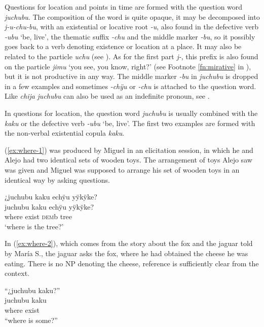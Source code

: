 Questions for location and points in time are formed with the question word \textit{juchubu}. The composition of the word is quite opaque, it may be decomposed into \textit{j-u-chu-bu}, with an existential or locative root \textit{-u}, also found in the defective verb \textit{-ubu} ‘be, live’, the thematic suffix \textit{-chu} and the middle marker \textit{-bu}, so it possibly goes back to a verb denoting existence or location at a place. It may also be related to the  particle \textit{uchu} (see ).  As for the first part \textit{j-}, this prefix is also found on the  particle \textit{jimu} ‘you see, you know, right?’ (see Footnote \ref{fn:mirative} in ), but it is not productive in any way. The middle marker \textit{-bu} in \textit{juchubu} is dropped in a few examples and sometimes \textit{-chÿu} or \textit{-chu} is attached to the question word. Like \textit{chija} \textit{juchubu} can also be used as an indefinite pronoun, see .

In questions for location, the question word \textit{juchubu} is usually combined with the  \textit{kaku} or the defective verb \textit{-ubu} ‘be, live’.  The first two examples are formed with the non-verbal existential copula \textit{kaku}.

(\ref{ex:where-1}) was produced by Miguel in an elicitation session, in which he and Alejo had two identical sets of wooden toys. The arrangement of toys Alejo saw was given and Miguel was supposed to arrange his set of wooden toys in an identical way by asking questions.

\ea\label{ex:where-1}
\begingl
\glpreamble ¿juchubu kaku echÿu yÿkÿke?\\
\gla juchubu kaku echÿu yÿkÿke?\\
\glb where exist \textsc{dem}b tree\\
\glft ‘where is the tree?’
\endgl
\trailingcitation{[mtx-e110915ls.19]}
\xe

In (\ref{ex:where-2}), which comes from the story about the fox and the jaguar told by María S., the jaguar asks the fox, where he had obtained the cheese he was eating. There is no NP denoting the cheese, reference is sufficiently clear from the context.

\ea\label{ex:where-2}
\begingl
\glpreamble “¿juchubu kaku?”\\
\gla juchubu kaku\\
\glb where exist\\
\glft “where is some?”
\endgl
\trailingcitation{[rxx-n120511l-1.033]}
\xe

